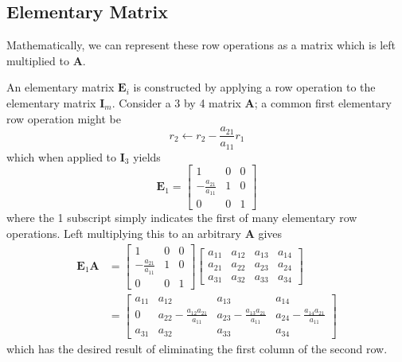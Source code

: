 \documentclass{article}
\begin{document}
\subsection{Elementary Matrix}
Mathematically, we can represent these row operations as a matrix
which is left multiplied to \(\symbf{A}\).
\begin{definition}
    An elementary matrix \(\symbf{E}_i\) is constructed by applying a row operation to the elementary matrix \(\symbf{I}_m\).
    Consider a 3 by 4 matrix \(\symbf{A}\); a common first elementary row operation might be
    \begin{equation*}
        r_2 \leftarrow r_2 - \frac{a_{21}}{a_{11}} r_1
    \end{equation*}
    which when applied to \(\symbf{I}_3\) yields
    \begin{equation*}
        \symbf{E}_1 =
        \begin{bmatrix}
            1                      & 0 & 0 \\
            -\frac{a_{21}}{a_{11}} & 1 & 0 \\
            0                      & 0 & 1
        \end{bmatrix}
    \end{equation*}
    where the 1 subscript simply indicates the first of many elementary row operations.
    Left multiplying this to an arbitrary \(\symbf{A}\) gives
    \begin{align*}
        \symbf{E}_1 \symbf{A} & =
        \begin{bmatrix}
            1                      & 0 & 0 \\
            -\frac{a_{21}}{a_{11}} & 1 & 0 \\
            0                      & 0 & 1
        \end{bmatrix}
        \begin{bmatrix}
            a_{11} & a_{12} & a_{13} & a_{14} \\
            a_{21} & a_{22} & a_{23} & a_{24} \\
            a_{31} & a_{32} & a_{33} & a_{34}
        \end{bmatrix} \\
                              & =
        \begin{bmatrix}
            a_{11} & a_{12}                              & a_{13}                              & a_{14}                              \\
            0      & a_{22}-\frac{a_{12} a_{21}}{a_{11}} & a_{23}-\frac{a_{13} a_{21}}{a_{11}} & a_{24}-\frac{a_{14} a_{21}}{a_{11}} \\
            a_{31} & a_{32}                              & a_{33}                              & a_{34}
        \end{bmatrix}
    \end{align*}
    which has the desired result of eliminating the first column of the second row.
\end{definition}
\end{document}
